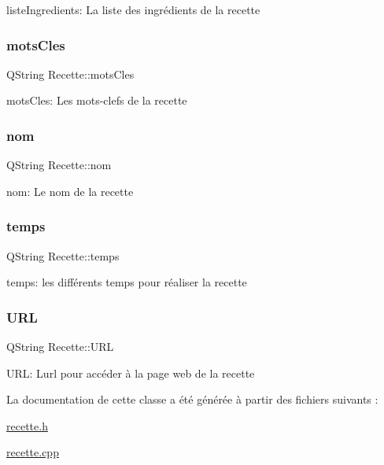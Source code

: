 liste\+Ingredients\+: La liste des ingrédients de la recette \mbox{\label{classRecette_ad17f7e5b745e0b01932acb6d6ff58dd6}} 
\subsubsection{\texorpdfstring{mots\+Cles}{motsCles}}
{\footnotesize\ttfamily Q\+String Recette\+::mots\+Cles\hspace{0.3cm}{\ttfamily [private]}}

mots\+Cles\+: Les mots-\/clefs de la recette \mbox{\label{classRecette_a8923b8c64bab1afaa4595442bc7b5803}} 
\subsubsection{\texorpdfstring{nom}{nom}}
{\footnotesize\ttfamily Q\+String Recette\+::nom\hspace{0.3cm}{\ttfamily [private]}}

nom\+: Le nom de la recette \mbox{\label{classRecette_a6165aaa32628fc48e4467f59c4cdcf99}} 
\subsubsection{\texorpdfstring{temps}{temps}}
{\footnotesize\ttfamily Q\+String Recette\+::temps\hspace{0.3cm}{\ttfamily [private]}}

temps\+: les différents temps pour réaliser la recette \mbox{\label{classRecette_a7e0fe7b2bce6f2936644636180455649}} 
\subsubsection{\texorpdfstring{U\+RL}{URL}}
{\footnotesize\ttfamily Q\+String Recette\+::\+U\+RL\hspace{0.3cm}{\ttfamily [private]}}

U\+RL\+: L\textquotesingle{}url pour accéder à la page web de la recette 

La documentation de cette classe a été générée à partir des fichiers suivants \+:\begin{DoxyCompactItemize}
\item 
\hyperlink{recette_8h}{recette.\+h}\item 
\hyperlink{recette_8cpp}{recette.\+cpp}\end{DoxyCompactItemize}
